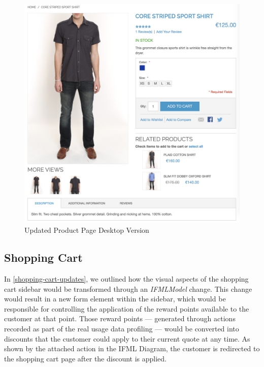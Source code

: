 \begin{figure}[H]
  \centering
    \includegraphics[width=14cm]{images/diagrams/after/desktop-product.png}
  \caption{Updated Product Page Desktop Version}
  \label{fig:desktop-after-product}
\end{figure}
\vspace{0.5cm}

\newpage
\subsection{Shopping Cart}

In \ref{shopping-cart-updates}, we outlined how the visual aspects of the shopping cart sidebar would be transformed through an \textit{IFMLModel} change. This change would result in a new form element within the sidebar, which would be responsible for controlling the application of the reward points available to the customer at that point. Those reward points --- generated through actions recorded as part of the real usage data profiling --- would be converted into discounts that the customer could apply to their current quote at any time. As shown by the attached action in the IFML Diagram, the customer is redirected to the shopping cart page after the discount is applied.

